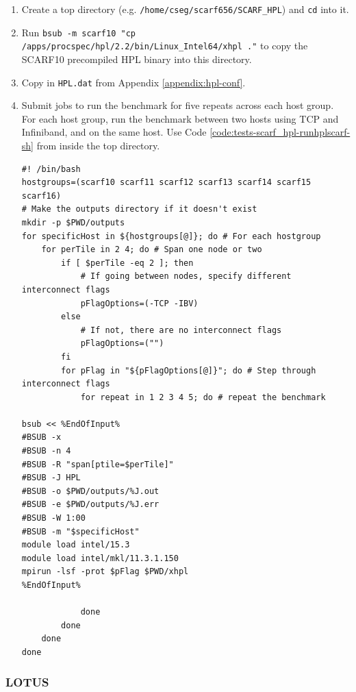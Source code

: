 \documentclass{article}
\newenvironment{code}{\captionsetup{type=listing}}{}
\begin{document}
        \begin{enumerate}
            \item Create a top directory (e.g. \verb|/home/cseg/scarf656/SCARF_HPL|) and \verb|cd| into it.
            \item Run \texttt{bsub -m scarf10 "cp /apps/procspec/hpl/2.2/bin/Linux_Intel64/xhpl ."} to copy the SCARF10 precompiled HPL binary into this directory.
            \item Copy in \verb|HPL.dat| from Appendix \ref{appendix:hpl-conf}.
            \item Submit jobs to run the benchmark for five repeats across each host group. For each host group, run the benchmark between two hosts using TCP and Infiniband, and on the same host. Use Code \ref{code:tests-scarf_hpl-runhplscarf-sh} from inside the top directory.


            \begin{code}
            \label{code:tests-scarf_hpl-runhplscarf-sh}

            \begin{verbatim}
#! /bin/bash
hostgroups=(scarf10 scarf11 scarf12 scarf13 scarf14 scarf15 scarf16)
# Make the outputs directory if it doesn't exist
mkdir -p $PWD/outputs
for specificHost in ${hostgroups[@]}; do # For each hostgroup
    for perTile in 2 4; do # Span one node or two
        if [ $perTile -eq 2 ]; then
            # If going between nodes, specify different interconnect flags
            pFlagOptions=(-TCP -IBV)
        else
            # If not, there are no interconnect flags
            pFlagOptions=("")
        fi
	    for pFlag in "${pFlagOptions[@]}"; do # Step through interconnect flags
            for repeat in 1 2 3 4 5; do # repeat the benchmark

bsub << %EndOfInput%
#BSUB -x
#BSUB -n 4
#BSUB -R "span[ptile=$perTile]"
#BSUB -J HPL
#BSUB -o $PWD/outputs/%J.out
#BSUB -e $PWD/outputs/%J.err
#BSUB -W 1:00
#BSUB -m "$specificHost"
module load intel/15.3
module load intel/mkl/11.3.1.150
mpirun -lsf -prot $pFlag $PWD/xhpl
%EndOfInput%

            done
        done
    done
done
            \end{verbatim}
            \end{code}
        \end{enumerate}


        \subsubsection{LOTUS}
\end{document}
